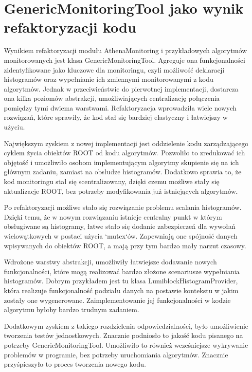 \section{GenericMonitoringTool jako wynik refaktoryzacji kodu}
Wynikiem refaktoryzacji modułu AthenaMonitoring i przykładowych algorytmów monitorowanych jest klasa GenericMonitoringTool.
Agreguje ona funkcjonalności zidentyfikowane jako kluczowe dla monitoringu, czyli możliwość deklaracji histogramów oraz wypełnianie ich zmiennymi monitorowanymi z kodu algorytmów.
Jednak w przeciwieństwie do pierwotnej implementacji, dostarcza ona kilka poziomów abstrakcji, umożliwiających centralizację połączenia pomiędzy tymi dwiema warstwami.
Refaktoryzacja wprowadziła wiele nowych rozwiązań, które sprawiły, że kod stał się bardziej elastyczny i łatwiejszy w użyciu.

Największym zyskiem z nowej implementacji jest oddzielenie kodu zarządzającego cyklem życia obiektów ROOT od kodu algorytmów. 
Pozwoliło to zredukować ich objętość i umożliwiło osobom implementującym algorytmy skupienie się na ich głównym zadaniu, zamiast na obsłudze histogramów.
Dodatkowo sprawia to, że kod monitoringu stał się scentralizowany, dzięki czemu możliwe stały się aktualizacje ROOT, bez potrzeby modyfikowania już istniejących algorytmów.

Po refaktoryzacji możliwe stało się rozwiązanie problemu scalania histogramów.
Dzięki temu, że w nowym rozwiązaniu istnieje centralny punkt w którym obsługiwane są histogramy, łatwe stało się dodanie zabezpieczeń dla wywołań wielowątkowych w postaci użycia `mutex`ów.
Zapewniają one spójność danych wpisywanych do obiektów ROOT, a mają przy tym bardzo mały narzut czasowy.

Wdrożone warstwy abstrakcji, umożliwiły łatwiejsze dodawanie nowych funkcjonalności, które mogą realizować bardzo złożone scenariusze wypełniania histogramów.
Dobrym przykładem jest tu klasa LumiblockHistogramProvider, która realizuje funkcjonalność podziału danych na postawie kontekstu w jakim zostały one wygenerowane. 
Zaimplementowanie jej funkcjonalności w kodzie algorytmu byłoby bardzo trudnym zadaniem. 

Dodatkowym zyskiem z takiego rozdzielenia odpowiedzialności, było umożliwienie tworzenia testów jednostkowych. 
Znacznie podniosło to jakość kodu pisanego na potrzeby GenericMonitoringTool.
Umożliwiło to również wcześniejsze wykrywanie problemów w programie, bez potrzeby uruchomiania algorytmów. 
Znacznie przyśpieszyło to proces tworzenia nowego kodu.

